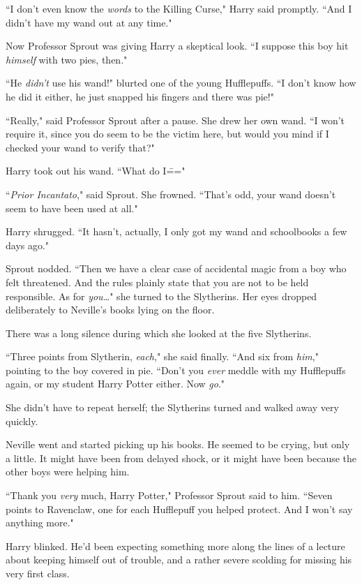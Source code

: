 ``I don't even know the \emph{words} to the Killing Curse," Harry said promptly. ``And I didn't have my wand out at any time."

Now Professor Sprout was giving Harry a skeptical look. ``I suppose this boy hit \emph{himself} with two pies, then."

``He \emph{didn't} use his wand!" blurted one of the young Hufflepuffs. ``I don't know how he did it either, he just snapped his fingers and there was pie!"

``Really," said Professor Sprout after a pause. She drew her own wand. ``I won't require it, since you do seem to be the victim here, but would you mind if I checked your wand to verify that?"

Harry took out his wand. ``What do I\==="

``\emph{Prior Incantato}," said Sprout. She frowned. ``That's odd, your wand doesn't seem to have been used at all."

Harry shrugged. ``It hasn't, actually, I only got my wand and schoolbooks a few days ago."

Sprout nodded. ``Then we have a clear case of accidental magic from a boy who felt threatened. And the rules plainly state that you are not to be held responsible. As for \emph{you{\ldots}}" she turned to the Slytherins. Her eyes dropped deliberately to Neville's books lying on the floor.

There was a long silence during which she looked at the five Slytherins.

``Three points from Slytherin, \emph{each}," she said finally. ``And six from \emph{him}," pointing to the boy covered in pie. ``Don't you \emph{ever} meddle with my Hufflepuffs again, or my student Harry Potter either. Now \emph{go}."

She didn't have to repeat herself; the Slytherins turned and walked away very quickly.

Neville went and started picking up his books. He seemed to be crying, but only a little. It might have been from delayed shock, or it might have been because the other boys were helping him.

``Thank you \emph{very} much, Harry Potter," Professor Sprout said to him. ``Seven points to Ravenclaw, one for each Hufflepuff you helped protect. And I won't say anything more."

Harry blinked. He'd been expecting something more along the lines of a lecture about keeping himself out of trouble, and a rather severe scolding for missing his very first class.


